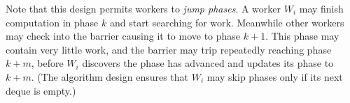 Note that this design permits workers to {\em jump phases}. A worker
$W_i$ may finish computation in phase $k$ and start searching for
work. Meanwhile other workers may check into the barrier causing it to
move to phase $k+1$. This phase may contain very little work, and the
barrier may trip repeatedly reaching phase $k+m$, before $W_i$
discovers the phase has advanced and updates its phase to $k+m$. (The
algorithm design ensures that $W_i$ may skip phases only if its next
deque is empty.) 


